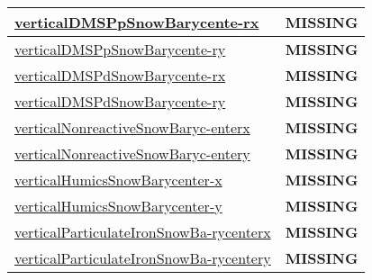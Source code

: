 {\begin{center}
\begin{longtable}{| p{2.0in} | p{4.0in} |}
    \hline
    \hyperref[subsec:var_sec_tracer_barycenter_verticalDMSPpSnowBarycenterx]{verticalDMSPpSnowBarycente-}\hyperref[subsec:var_sec_tracer_barycenter_verticalDMSPpSnowBarycenterx]{rx  }& {\bf \color{red} MISSING} \\
    \hline
    \hyperref[subsec:var_sec_tracer_barycenter_verticalDMSPpSnowBarycentery]{verticalDMSPpSnowBarycente-}\hyperref[subsec:var_sec_tracer_barycenter_verticalDMSPpSnowBarycentery]{ry  }& {\bf \color{red} MISSING} \\
    \hline
    \hyperref[subsec:var_sec_tracer_barycenter_verticalDMSPdSnowBarycenterx]{verticalDMSPdSnowBarycente-}\hyperref[subsec:var_sec_tracer_barycenter_verticalDMSPdSnowBarycenterx]{rx  }& {\bf \color{red} MISSING} \\
    \hline
    \hyperref[subsec:var_sec_tracer_barycenter_verticalDMSPdSnowBarycentery]{verticalDMSPdSnowBarycente-}\hyperref[subsec:var_sec_tracer_barycenter_verticalDMSPdSnowBarycentery]{ry  }& {\bf \color{red} MISSING} \\
    \hline
    \hyperref[subsec:var_sec_tracer_barycenter_verticalNonreactiveSnowBarycenterx]{verticalNonreactiveSnowBaryc-}\hyperref[subsec:var_sec_tracer_barycenter_verticalNonreactiveSnowBarycenterx]{enterx  }& {\bf \color{red} MISSING} \\
    \hline
    \hyperref[subsec:var_sec_tracer_barycenter_verticalNonreactiveSnowBarycentery]{verticalNonreactiveSnowBaryc-}\hyperref[subsec:var_sec_tracer_barycenter_verticalNonreactiveSnowBarycentery]{entery  }& {\bf \color{red} MISSING} \\
    \hline
    \hyperref[subsec:var_sec_tracer_barycenter_verticalHumicsSnowBarycenterx]{verticalHumicsSnowBarycenter-}\hyperref[subsec:var_sec_tracer_barycenter_verticalHumicsSnowBarycenterx]{x  }& {\bf \color{red} MISSING} \\
    \hline
    \hyperref[subsec:var_sec_tracer_barycenter_verticalHumicsSnowBarycentery]{verticalHumicsSnowBarycenter-}\hyperref[subsec:var_sec_tracer_barycenter_verticalHumicsSnowBarycentery]{y  }& {\bf \color{red} MISSING} \\
    \hline
    \hyperref[subsec:var_sec_tracer_barycenter_verticalParticulateIronSnowBarycenterx]{verticalParticulateIronSnowBa-}\hyperref[subsec:var_sec_tracer_barycenter_verticalParticulateIronSnowBarycenterx]{rycenterx  }& {\bf \color{red} MISSING} \\
    \hline
    \hyperref[subsec:var_sec_tracer_barycenter_verticalParticulateIronSnowBarycentery]{verticalParticulateIronSnowBa-}\hyperref[subsec:var_sec_tracer_barycenter_verticalParticulateIronSnowBarycentery]{rycentery  }& {\bf \color{red} MISSING} \\

\end{longtable}
\end{center}}
